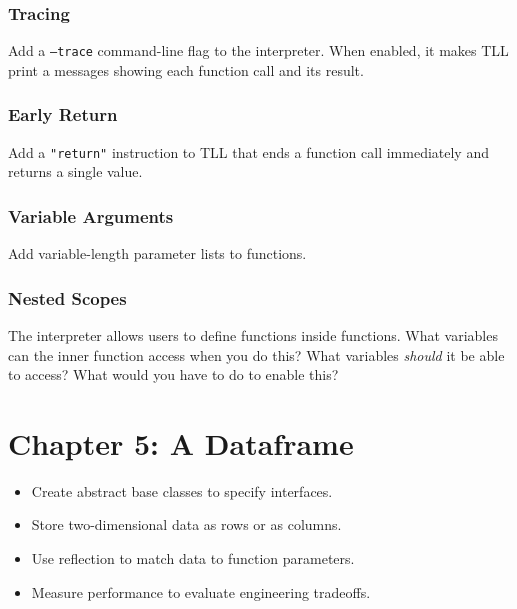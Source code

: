 \documentclass{scrbook}
\begin{document}
\subsection*{Tracing}


Add a \texttt{--trace} command-line flag to the interpreter.
When enabled, it makes TLL print a messages showing each function call and its result.

\subsection*{Early Return}


Add a \texttt{"return"} instruction to TLL that ends a function call immediately
and returns a single value.

\subsection*{Variable Arguments}


Add variable-length parameter lists to functions.

\subsection*{Nested Scopes}


The interpreter allows users to define functions inside functions.
What variables can the inner function access when you do this?
What variables \emph{should} it be able to access?
What would you have to do to enable this?

\chapter{Chapter 5: A Dataframe}\label{dataframe}

\begin{itemize}

\item Create abstract base classes to specify interfaces.

\item Store two-dimensional data as rows or as columns.

\item Use reflection to match data to function parameters.

\item Measure performance to evaluate engineering tradeoffs.

\end{itemize}
\end{document}
